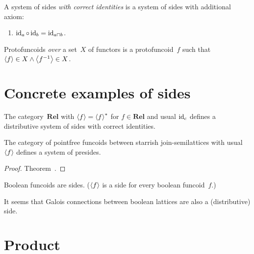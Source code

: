 \begin{defn}
A system of sides \emph{with correct identities} is a system of sides with additional axiom:
\begin{enumerate}
\item $\operatorname{id}_a\circ\operatorname{id}_b = \operatorname{id}_{a\sqcap b}$.
\end{enumerate}
\end{defn}

\begin{defn}
Protofuncoids \emph{over} a set~$X$ of functors is a protofuncoid~$f$
such that $\left\langle f\right\rangle\in X\land\left\langle f^{-1}\right\rangle\in X$.
\end{defn}

\section{Concrete examples of sides}

\begin{obvious}
The category~$\mathbf{Rel}$ with $\left\langle f\right\rangle=\left\langle f\right\rangle ^{\ast}$ for $f\in\mathbf{Rel}$ and usual $\operatorname{id}_c$ defines a distributive system of sides with correct identities.
\end{obvious}

\begin{prop}
The category of pointfree funcoids between starrish join-semilattices with usual~$\left\langle f\right\rangle$ defines a system of presides.
\end{prop}

\begin{proof}
Theorem~.
\end{proof}

Boolean funcoids  are sides.
($\left\langle f\right\rangle$ is a side for every boolean funcoid~$f$.)

It seems  that Galois connections between boolean lattices 
are also a (distributive) side.



\section{Product}

